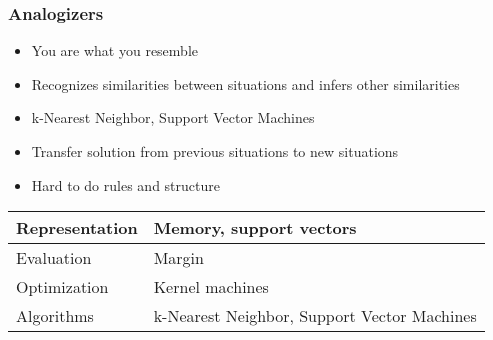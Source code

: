 \documentclass[UTF8,11pt,colorlinks,compress,openany]{beamer}%
\begin{document}
\begin{frame}\frametitle{Analogizers}
\begin{itemize}
	\item You are what you resemble
	\item Recognizes similarities between situations and infers other similarities
	\item k-Nearest Neighbor, Support Vector Machines
	\item Transfer solution from previous situations to new situations
	\item Hard to do rules and structure
\end{itemize}
\begin{table}
\begin{tabu}{l|l}
\hline
Representation &Memory, support vectors\\
\hline
Evaluation &Margin\\
\hline
Optimization &Kernel machines\\
\hline
Algorithms &k-Nearest Neighbor, Support Vector Machines\\
\hline
\end{tabu}
\end{table}
\end{frame}
\end{document}

